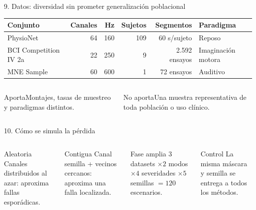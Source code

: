 \documentclass[aspectratio=169,10pt]{beamer}
\begin{document}
\begin{frame}{9. Datos: diversidad sin prometer generalización poblacional}
\centering
\small
\begin{tabular}{@{}lrrrrl@{}}
\toprule
\textbf{Conjunto} & \textbf{Canales} & \textbf{Hz} & \textbf{Sujetos} & \textbf{Segmentos} & \textbf{Paradigma}\\
\midrule
PhysioNet & 64 & 160 & 109 & 60 s/sujeto & Reposo\\
BCI Competition IV 2a & 22 & 250 & 9 & 2.592 ensayos & Imaginación motora\\
MNE Sample & 60 & 600 & 1 & 72 ensayos & Auditivo\\
\bottomrule
\end{tabular}
\vspace{0.8em}
\begin{columns}[T,onlytextwidth]
\begin{block}{Aporta}Montajes, tasas de muestreo y paradigmas distintos.\end{block}
\begin{block}{No aporta}Una muestra representativa de toda población o uso clínico.\end{block}
\end{columns}
\end{frame}

\begin{frame}{10. Cómo se simula la pérdida}
\begin{columns}[T,onlytextwidth]
\begin{block}{Aleatoria}
Canales distribuidos al azar: aproxima fallas esporádicas.
\end{block}
\begin{block}{Contigua}
Canal semilla + vecinos cercanos: aproxima una falla localizada.
\end{block}
\begin{block}{Fase amplia}
$3$ datasets $\times 2$ modos $\times 4$ severidades $\times 5$ semillas $=120$ escenarios.
\end{block}
\begin{block}{Control}
La misma máscara y semilla se entrega a todos los métodos.
\end{block}
\end{columns}
\vspace{0.4em}
\end{frame}
\end{document}
